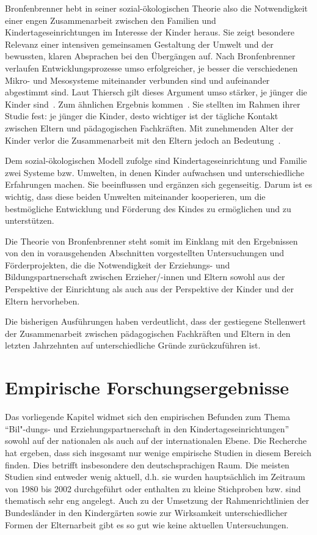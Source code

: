 \documentclass[12pt,a4paper]{article}
\begin{document}
	Bronfenbrenner hebt in seiner sozial-ökologischen Theorie also die Notwendigkeit einer engen Zusammenarbeit zwischen den Familien und Kindertageseinrichtungen im Interesse der Kinder heraus. Sie zeigt besondere Relevanz einer intensiven gemeinsamen Gestaltung der Umwelt und der bewussten, klaren Absprachen bei den Übergängen auf. Nach Bronfenbrenner verlaufen Entwicklungsprozesse umso erfolgreicher, je besser die verschiedenen Mikro- und Mesosysteme miteinander verbunden sind und aufeinander abgestimmt sind. Laut Thiersch gilt dieses Argument umso stärker, je jünger die Kinder sind~\parencite[S.~86]{Thiersch_2006}. Zum ähnlichen Ergebnis kommen~\textcite{Sandberg}. Sie stellten im Rahmen ihrer Studie fest: je jünger die Kinder, desto wichtiger ist der tägliche Kontakt zwischen Eltern und pädagogischen Fachkräften. Mit zunehmenden Alter der Kinder verlor die Zusammenarbeit mit den Eltern jedoch an Bedeutung~\parencite[S.~151-161]{Sandberg}.
	
	Dem sozial-ökologischen Modell zufolge sind Kindertageseinrichtung und Familie zwei Systeme bzw. Umwelten, in denen Kinder aufwachsen und unterschiedliche Erfahrungen machen. Sie beeinflussen und ergänzen sich gegenseitig. Darum ist es wichtig, dass diese beiden Umwelten miteinander kooperieren, um die bestmögliche Entwicklung und Förderung des Kindes zu ermöglichen und zu unterstützen. 
	
Die Theorie von Bronfenbrenner steht somit im Einklang mit den Ergebnissen von den in vorausgehenden Abschnitten vorgestellten Untersuchungen und Förderprojekten, die die Notwendigkeit der Erziehungs- und Bildungspartnerschaft zwischen Erzieher/-innen und Eltern sowohl aus der Perspektive der Einrichtung als auch aus der Perspektive der Kinder und der Eltern hervorheben. 

Die bisherigen Ausführungen haben verdeutlicht, dass der gestiegene Stellenwert der Zusammenarbeit zwischen pädagogischen Fachkräften und Eltern in den letzten Jahrzehnten auf unterschiedliche Gründe zurückzuführen ist.

\section{Empirische Forschungsergebnisse} 
\label{forsch} 
Das vorliegende Kapitel widmet sich den empirischen Befunden zum Thema "`Bil"-dungs- und Erziehungspartnerschaft in den Kindertageseinrichtungen"' sowohl auf der nationalen als auch auf der internationalen Ebene. Die Recherche hat ergeben, dass sich insgesamt nur wenige empirische Studien in diesem Bereich finden. Dies betrifft insbesondere den deutschsprachigen Raum. Die meisten Studien sind entweder wenig aktuell, d.h. sie wurden hauptsächlich im Zeitraum von 1980 bis 2002 durchgeführt oder enthalten zu kleine Stichproben bzw. sind thematisch sehr eng angelegt. Auch zu der Umsetzung der Rahmenrichtlinien der Bundesländer in den Kindergärten sowie zur Wirksamkeit unterschiedlicher Formen der Elternarbeit gibt es so gut wie keine aktuellen Untersuchungen.
\end{document}

